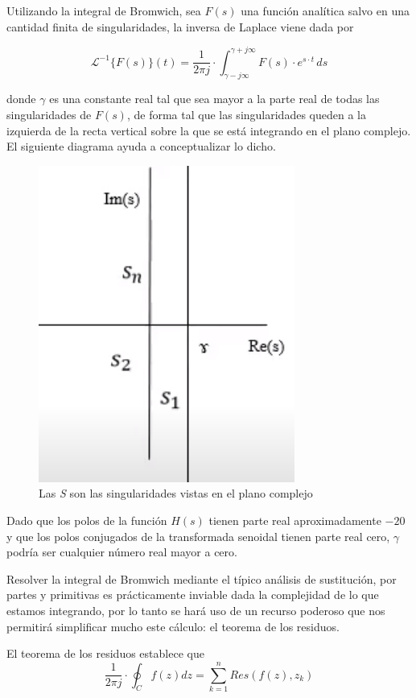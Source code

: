 \documentclass[11pt,a4paper]{report}
\begin{document}
\bigskip
Utilizando la integral de Bromwich, sea $F(s)$ una función analítica salvo en una cantidad finita de singularidades, la inversa de Laplace viene dada por

\[\mathcal{L}^{-1}\{F(s)\}(t) = \frac{1}{2\pi j} \cdot \int_{\gamma-j\infty}^{\gamma+j\infty} F(s) \cdot e^{s \cdot t}\, ds\]

donde $\gamma$ es una constante real tal que sea mayor a la parte real de todas las singularidades de $F(s)$, de forma tal que las singularidades queden a la izquierda de la recta vertical sobre la que se está integrando en el plano complejo. El siguiente diagrama ayuda a conceptualizar lo dicho.

\begin{figure}[h!]
\centering
\includegraphics[scale=1]{diagramaBromwich1.png}
\caption{Las \textit{S} son las singularidades vistas en el plano complejo}
\end{figure}

Dado que los polos de la función $H(s)$ tienen parte real aproximadamente $-20$ y que los polos conjugados de la transformada senoidal tienen parte real cero, $\gamma$ podría ser cualquier número real mayor a cero. 

\bigskip
Resolver la integral de Bromwich mediante el típico análisis de sustitución, por partes y primitivas es prácticamente inviable dada la complejidad de lo que estamos integrando, por lo tanto se hará uso de un recurso poderoso que nos permitirá simplificar mucho este cálculo: el teorema de los residuos. 

\bigskip
El teorema de los residuos establece que
\[\frac{1}{2\pi j} \cdot \oint_C f(z) dz = \sum_{k=1}^{n} Res(f(z), z_{k})\]
\end{document}

